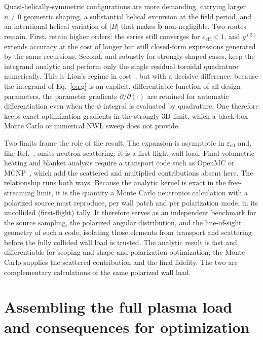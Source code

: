 \documentclass[11pt]{article}
\newcommand{\bperp}{\tilde{\bm{b}}}
\newcommand{\eps}{\varepsilon}
\begin{document}
Quasi-helically-symmetric configurations are more demanding, carrying larger $n\neq0$ geometric shaping, a substantial helical excursion at the field period, and an intentional helical variation of $\lvert B\rvert$ that makes $\bperp$ non-negligible. Two routes remain. First, retain higher orders: the series still converges for $\eps_{\mathrm{eff}}<1$, and $g^{(3)}$ extends accuracy at the cost of longer but still closed-form expressions generated by the same recursions. Second, and robustly for strongly shaped cases, keep the integrand analytic and perform only the single residual toroidal quadrature numerically. This is Lion's regime in cost~\cite{lion2022}, but with a decisive difference: because the integrand of Eq.~\eqref{eq:g} is an explicit, differentiable function of all design parameters, the parameter gradients $\partial/\partial(\cdot)$ are retained for automatic differentiation even when the $\phi$ integral is evaluated by quadrature. One therefore keeps exact optimization gradients in the strongly 3D limit, which a black-box Monte Carlo or numerical NWL sweep does not provide.

Two limits frame the role of the result. The expansion is asymptotic in $\eps_{\mathrm{eff}}$ and, like Ref.~\cite{schwartz2025}, omits neutron scattering: it is a first-flight wall load. Final volumetric heating and blanket analysis require a transport code such as OpenMC or MCNP~\cite{romano2015}, which add the scattered and multiplied contributions absent here. The relationship runs both ways. Because the analytic kernel is exact in the free-streaming limit, it is the quantity a Monte Carlo neutronics calculation with a polarized source must reproduce, per wall patch and per polarization mode, in its uncollided (first-flight) tally. It therefore serves as an independent benchmark for the source sampling, the polarized angular distribution, and the line-of-sight geometry of such a code, isolating those elements from transport and scattering before the fully collided wall load is trusted. The analytic result is fast and differentiable for scoping and shape-and-polarization optimization; the Monte Carlo supplies the scattered contribution and the final fidelity. The two are complementary calculations of the same polarized wall load.

\section{Assembling the full plasma load and consequences for optimization}
\label{sec:assembly}
\end{document}

